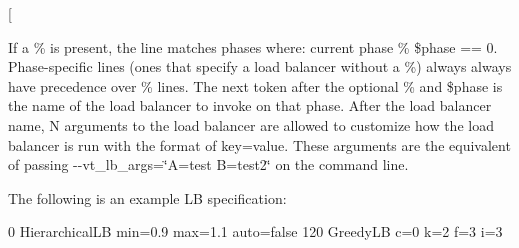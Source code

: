 \begin{DoxyCode}
[%
\end{DoxyCode}


If a {\ttfamily \%} is present, the line matches phases where\+: {\ttfamily current phase \% \$phase == 0}. Phase-\/specific lines (ones that specify a load balancer without a {\ttfamily \%}) always always have precedence over {\ttfamily \%} lines. The next token after the optional {\ttfamily \%} and {\ttfamily \$phase} is the name of the load balancer to invoke on that phase. After the load balancer name, {\ttfamily N} arguments to the load balancer are allowed to customize how the load balancer is run with the format of {\ttfamily key=value}. These arguments are the equivalent of passing {\ttfamily -\/-\/vt\+\_\+lb\+\_\+args=\char`\"{}\+A=test B=test2\char`\"{}} on the command line.

The following is an example LB specification\+:


\begin{DoxyCode}
0 HierarchicalLB min=0.9 max=1.1 auto=false
120 GreedyLB c=0 k=2 f=3 i=3
\end{DoxyCode}


